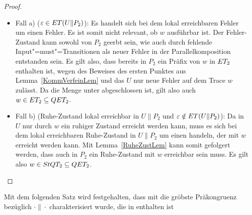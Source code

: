 \begin{proof}
\begin{itemize}
    \item Fall a) ($\varepsilon\in ET (U\|P_2)$): Es handelt sich bei dem lokal
      erreichbaren \glqq Fehler\grqq{} um einen Fehler. Es ist somit nicht
      relevant, ob $w$ ausführbar ist. Der Fehler-Zustand kann sowohl von $P_2$
      geerbt sein, wie auch durch fehlende Input"=must"=Transitionen als neuer
      Fehler in der Parallelkomposition entstanden sein. Es gilt
      also, dass bereits in $P_2$ ein Präfix von $w$ in $ET _2$ enthalten ist,
      wegen des Beweises des ersten Punktes aus Lemma~\ref{KommVerfeinLem} und
      das $U$ nur neue Fehler auf dem Trace $w$ zulässt. Da die
      Menge \ET{} unter \cont{} abgeschlossen ist, gilt also auch $w\in ET
      _2\subseteq QET _2$.
    \item Fall b) (Ruhe-Zustand lokal erreichbar in $U\|P_2$ und
      $\varepsilon\notin ET (U\|P_2)$): Da in $U$ nur durch $w$ ein ruhiger
      Zustand erreicht werden kann, muss es sich bei dem lokal erreichbaren
      Ruhe-Zustand in $U\|P_2$ um einen handeln, der mit $w$ erreicht werden
      kann. Mit Lemma~\ref{RuheZustLem} kann somit gefolgert werden, dass auch
      in $P_2$ ein Ruhe-Zustand mit $w$ erreichbar sein muss. Es gilt also
      $w\in StQT _2\subseteq QET _2$.
  \end{itemize}
\end{proof}

Mit dem folgenden Satz wird festgehalten, dass mit \QRel{} die gröbste
Präkongruenz bezüglich $\cdot\|\cdot$ charakterisiert wurde, die in \QBRel{}
enthalten ist

